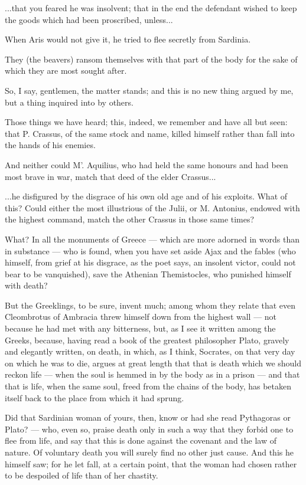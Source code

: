  ...that you feared he was insolvent; that in the end the defendant wished to keep the goods which had been proscribed, unless...

 When Aris would not give it, he tried to flee secretly from Sardinia.

 They (the beavers) ransom themselves with that part of the body for the sake of which they are most sought after.

 So, I say, gentlemen, the matter stands; and this is no new thing argued by me, but a thing inquired into by others.

 Those things we have heard; this, indeed, we remember and have all but seen: that P. Crassus, of the same stock and name, killed himself rather than fall into the hands of his enemies.

 And neither could M'. Aquilius, who had held the same honours and had been most brave in war, match that deed of the elder Crassus...

 ...he disfigured by the disgrace of his own old age and of his exploits. What of this? Could either the most illustrious of the Julii, or M. Antonius, endowed with the highest command, match the other Crassus in those same times?

 What? In all the monuments of Greece --- which are more adorned in words than in substance --- who is found, when you have set aside Ajax and the fables (who himself, from grief at his disgrace, as the poet says, an insolent victor, could not bear to be vanquished), save the Athenian Themistocles, who punished himself with death?

 But the Greeklings, to be sure, invent much; among whom they relate that even Cleombrotus of Ambracia threw himself down from the highest wall --- not because he had met with any bitterness, but, as I see it written among the Greeks, because, having read a book of the greatest philosopher Plato, gravely and elegantly written, on death, in which, as I think, Socrates, on that very day on which he was to die, argues at great length that that is death which we should reckon life --- when the soul is hemmed in by the body as in a prison --- and that that is life, when the same soul, freed from the chains of the body, has betaken itself back to the place from which it had sprung.

 Did that Sardinian woman of yours, then, know or had she read Pythagoras or Plato? --- who, even so, praise death only in such a way that they forbid one to flee from life, and say that this is done against the covenant and the law of nature. Of voluntary death you will surely find no other just cause. And this he himself saw; for he let fall, at a certain point, that the woman had chosen rather to be despoiled of life than of her chastity.


